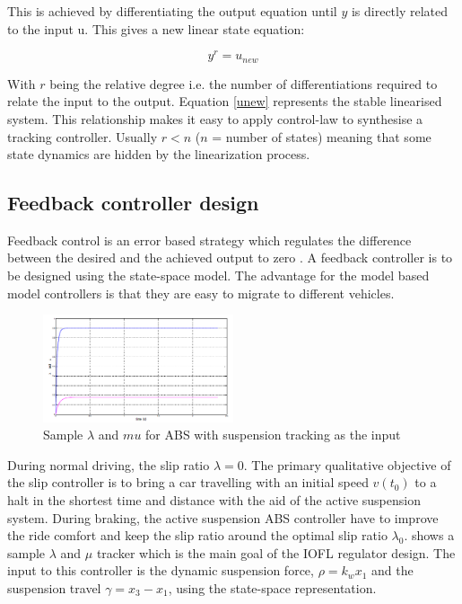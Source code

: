 \documentclass[10pt,twocolumn]{witseiepaper}
\begin{document}
This is achieved by differentiating the output equation until $y$ is directly related to the input u. This gives a new linear state equation:

\begin{equation}
  y^r = u_{new}
  \label{eqn:unew}
\end{equation}

With $r$ being the relative degree i.e. the number of differentiations required to relate the input to the output. Equation \ref{unew} represents the stable linearised system. This relationship makes it easy to apply control-law to synthesise a tracking controller. Usually $r < n$ ($n$ = number of states) meaning that some state dynamics are hidden by the linearization process.


\subsection{Feedback controller design}

Feedback control is an error based strategy which regulates the difference between the desired and the achieved output to zero \cite{Sims:1999}. A feedback controller is to be designed using the state-space model. The advantage for the model based model controllers is that they are easy to migrate to different vehicles. 

\begin{figure}[ht!]
	\centering
		\includegraphics[width=0.50\textwidth]{sliptrack.png}
	\caption{Sample $\lambda$ and $mu$ for ABS with suspension tracking as the input \cite{Nyandoro2:2011}}
	\label{fig:slipTrack}
\end{figure}

During normal driving, the slip ratio $\lambda = 0$. The primary qualitative objective of the slip controller is to bring a car travelling with an initial speed $v(t_0)$ to a halt \cite{Pedro:2009} in the shortest time and distance with the aid of the active suspension system. During braking, the active suspension ABS controller have to improve the ride comfort and keep the slip ratio around the optimal slip ratio $\lambda _0$.  shows a sample $\lambda$ and $\mu$ tracker which is the main goal of the IOFL regulator design. The input to this controller is the dynamic suspension force, $\rho = k_wx_1$ and the suspension travel $\gamma = x_3-x_1$, using the state-space representation.
\end{document}
